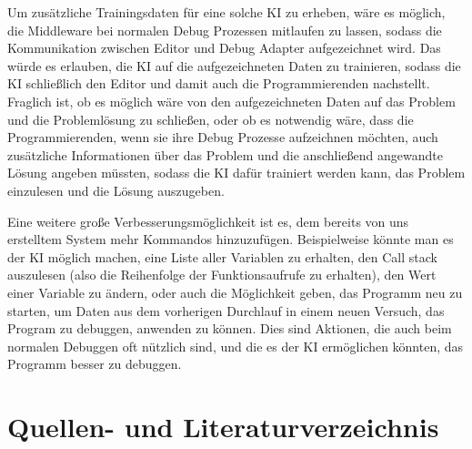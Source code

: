 \documentclass[a4paper,12pt,ngerman]{scrartcl}
\begin{document}
Um zusätzliche Trainingsdaten für eine solche KI zu erheben, wäre es möglich, die Middleware bei normalen Debug Prozessen mitlaufen zu lassen, sodass die Kommunikation zwischen Editor und Debug Adapter aufgezeichnet wird. Das würde es erlauben, die KI auf die aufgezeichneten Daten zu trainieren, sodass die KI schließlich den Editor und damit auch die Programmierenden nachstellt. Fraglich ist, ob es möglich wäre von den aufgezeichneten Daten auf das Problem und die Problemlösung zu schließen, oder ob es notwendig wäre, dass die Programmierenden, wenn sie ihre Debug Prozesse aufzeichnen möchten, auch zusätzliche Informationen über das Problem und die anschließend angewandte Lösung angeben müssten, sodass die KI dafür trainiert werden kann, das Problem einzulesen und die Lösung auszugeben.

Eine weitere große Verbesserungsmöglichkeit ist es, dem bereits von uns erstelltem System mehr Kommandos hinzuzufügen. Beispielweise könnte man es der KI möglich machen, eine Liste aller Variablen zu erhalten, den Call stack auszulesen (also die Reihenfolge der Funktionsaufrufe zu erhalten), den Wert einer Variable zu ändern, oder auch die Möglichkeit geben, das Programm neu zu starten, um Daten aus dem vorherigen Durchlauf in einem neuen Versuch, das Program zu debuggen, anwenden zu können. Dies sind Aktionen, die auch beim normalen Debuggen oft nützlich sind, und die es der KI ermöglichen könnten, das Programm besser zu debuggen.

\clearpage
\section{Quellen- und Literaturverzeichnis}
\end{document}
